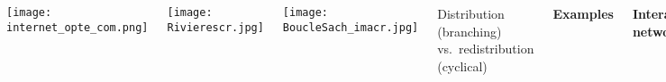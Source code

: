   \begin{columns}[t]
    
      \texttt{[image: internet\_opte\_com.png]} 
    
    \texttt{[image: Rivierescr.jpg]}
    
    \texttt{[image: BoucleSach\_imacr.jpg]} 
  
  
   \alert{Distribution} (branching) vs.\ \alert{redistribution} (cyclical)
  


  \textbf{Examples}

      
    \textbf{Interaction networks}
      
        The Blogosphere
        Biochemical networks
        Gene-protein networks
        Food webs: who eats whom
        The World Wide Web (?)
        Airline networks
        Call networks (AT\&T)
        The Media
        Paper citations
      
    
    
    \texttt{[image: datamining-core-2006-06-27.png]}\\
    {\tiny {}}
  

  \textbf{Examples}

      
    \textbf{Interaction networks: social networks}
      
       Snogging
       Friendships
       Acquaintances
       Boards and directors
       Organizations %
       
        , 
      
    
    
    \texttt{[image: bearman\_sex\_network.jpg]}\\
    {\tiny (Bearman \etal, 2004)} 
  
  
  
  `Remotely sensed' by:
  email activity, 
  instant messaging, 
  phone logs {\alert{(*cough*)}}.
  


  \textbf{Examples}

    \texttt{[image: bearman\_sex\_network.jpg]}\\


  \textbf{Examples}


\end{columns}
